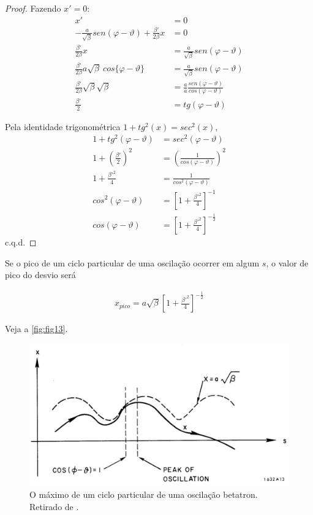 \begin{proof}
	Fazendo $x'=0$:
	\begin{align*}
        x'&=0\\
        -\frac{a}{\sqrt{\beta}}sen(\varphi-\vartheta)+\frac{\beta'}{2\beta}x &= 0\\
        \frac{\beta'}{2\beta}x &= \frac{a}{\sqrt{\beta}}sen(\varphi-\vartheta)\\
        \frac{\beta'}{2\beta}a\sqrt{\beta}\ cos\{\varphi-\vartheta\} &= \frac{a}{\sqrt{\beta}}sen(\varphi-\vartheta)\\
        \frac{\beta'}{2\beta}\sqrt{\beta}\sqrt{\beta} &= \frac{a}{a}\frac{sen(\varphi-\vartheta)}{cos(\varphi-\vartheta)}\\
        \frac{\beta'}{2} &= tg(\varphi-\vartheta)
	\end{align*}
	
	Pela identidade trigonométrica $1+tg^2(x) = sec^2(x)$,
	\begin{align*}
        1+tg^2(\varphi-\vartheta) &= sec^2(\varphi-\vartheta)\\
        1+\left(\frac{\beta'}{2}\right)^2 &= \left(\frac{1}{cos(\varphi-\vartheta)}\right)^2\\
        1+\frac{\beta'^2}{4} &= \frac{1}{cos^2(\varphi-\vartheta)}\\
        cos^2(\varphi-\vartheta) &= \left[1+\frac{\beta'^2}{4}\right]^{-1}\\
        cos(\varphi-\vartheta) &= \left[1+\frac{\beta'^2}{4}\right]^{-\frac{1}{2}}
	\end{align*}
	c.q.d.
\end{proof}
	
Se o pico de um ciclo particular de uma oscilação ocorrer em algum $s$, o valor de pico do desvio será
	
\begin{align}
	x_{pico} = a\sqrt{\beta}\left[1+\frac{\beta'^2}{4}\right]^{-\frac{1}{2}}
\end{align}

Veja a \autoref{fig:fig13}.

\begin{figure}[!htb]
	\centering
	\includegraphics[width=0.8\linewidth]{./Figuras/fig13.jpeg}
	\caption{O máximo de um ciclo particular de uma oscilação betatron. Retirado de \cite{sands1970physics}.}
	\label{fig:fig13}
\end{figure}
	
